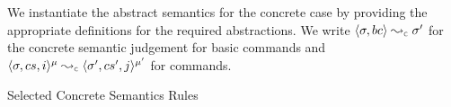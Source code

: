 We instantiate the abstract semantics for the concrete case by providing the appropriate definitions 
for the required abstractions.
We write $\absbsemrule{\jstate, \bcmd}{\jstate'}{\concrete}$ for the concrete semantic 
judgement for \jsil basic commands and $\abssemrule{\jstate, \cs, i}{\jstate', \cs', j}{\mode}{\mode'}{\concrete}$ 
for \jsil commands. 

\begin{display}{Selected Concrete Semantics Rules}
\end{display}
